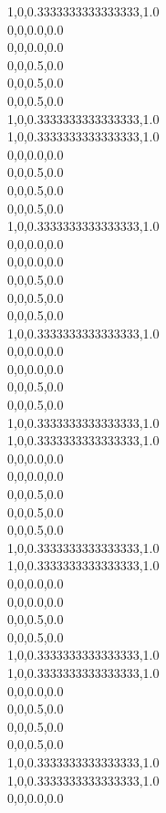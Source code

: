 1,0,0.3333333333333333,1.0\\
0,0,0.0,0.0\\
0,0,0.0,0.0\\
0,0,0.5,0.0\\
0,0,0.5,0.0\\
0,0,0.5,0.0\\
1,0,0.3333333333333333,1.0\\
1,0,0.3333333333333333,1.0\\
0,0,0.0,0.0\\
0,0,0.5,0.0\\
0,0,0.5,0.0\\
0,0,0.5,0.0\\
1,0,0.3333333333333333,1.0\\
0,0,0.0,0.0\\
0,0,0.0,0.0\\
0,0,0.5,0.0\\
0,0,0.5,0.0\\
0,0,0.5,0.0\\
1,0,0.3333333333333333,1.0\\
0,0,0.0,0.0\\
0,0,0.0,0.0\\
0,0,0.5,0.0\\
0,0,0.5,0.0\\
1,0,0.3333333333333333,1.0\\
1,0,0.3333333333333333,1.0\\
0,0,0.0,0.0\\
0,0,0.0,0.0\\
0,0,0.5,0.0\\
0,0,0.5,0.0\\
0,0,0.5,0.0\\
1,0,0.3333333333333333,1.0\\
1,0,0.3333333333333333,1.0\\
0,0,0.0,0.0\\
0,0,0.0,0.0\\
0,0,0.5,0.0\\
0,0,0.5,0.0\\
1,0,0.3333333333333333,1.0\\
1,0,0.3333333333333333,1.0\\
0,0,0.0,0.0\\
0,0,0.5,0.0\\
0,0,0.5,0.0\\
0,0,0.5,0.0\\
1,0,0.3333333333333333,1.0\\
1,0,0.3333333333333333,1.0\\
0,0,0.0,0.0\\
